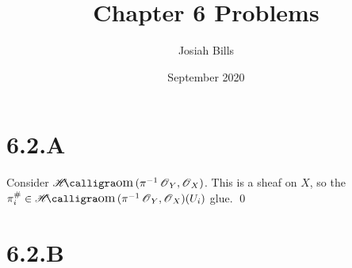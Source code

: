 \documentclass{article}
\title{Chapter 6 Problems}
\author{Josiah Bills}
\date{September 2020}
\begin{document}
\maketitle

\section{6.2.A}
Consider $\Hom(\pi^{-1}\Osh_Y, \Osh_X)$. This is a sheaf on $X$, so the $\pi^{\#}_i \in \Hom(\pi^{-1}\Osh_Y, \Osh_X)(U_i)$ glue. \qed

\section{6.2.B}
\end{document}
